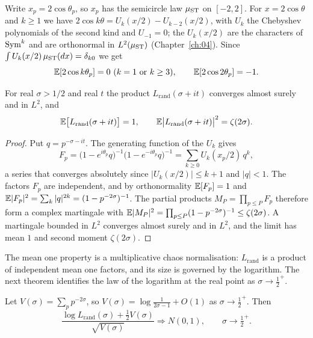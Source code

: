 Write $x_p = 2\cos\theta_p$, so $x_p$ has the semicircle law $\mu_{\mathrm{ST}}$ on $[-2,2]$. For $x = 2\cos\theta$ and $k\ge1$ we have $2\cos k\theta = U_k(x/2) - U_{k-2}(x/2)$, with $U_k$ the Chebyshev polynomials of the second kind and $U_{-1} = 0$; the $U_k(x/2)$ are the characters of $\operatorname{Sym}^k$ and are orthonormal in $L^2(\mu_{\mathrm{ST}})$ (Chapter~\ref{ch:04}). Since $\int U_k(x/2)\,\mu_{\mathrm{ST}}(dx) = \delta_{k0}$ we get
\begin{equation}\label{eq:ch09moments}
\mathbb{E}[2\cos k\theta_p] = 0 \ (k=1 \text{ or } k\ge3), \qquad \mathbb{E}[2\cos 2\theta_p] = -1 .
\end{equation}

\begin{proposition}\label{prop:ch09martingale}
For real $\sigma>1/2$ and real $t$ the product $L_{\mathrm{rand}}(\sigma+it)$ converges almost surely and in $L^2$, and
\[
\mathbb{E}\bigl[L_{\mathrm{rand}}(\sigma+it)\bigr] = 1,\qquad \mathbb{E}\bigl|L_{\mathrm{rand}}(\sigma+it)\bigr|^2 = \zeta(2\sigma).
\]
\end{proposition}

\begin{proof}
Put $q = p^{-\sigma-it}$. The generating function of the $U_k$ gives
\[
F_p = \bigl(1-e^{i\theta_p}q\bigr)^{-1}\bigl(1-e^{-i\theta_p}q\bigr)^{-1} = \sum_{k\ge0}U_k(x_p/2)\,q^k ,
\]
a series that converges absolutely since $|U_k(x/2)|\le k+1$ and $|q|<1$. The factors $F_p$ are independent, and by orthonormality $\mathbb{E}[F_p] = 1$ and $\mathbb{E}|F_p|^2 = \sum_k |q|^{2k} = (1-p^{-2\sigma})^{-1}$. The partial products $M_P = \prod_{p\le P}F_p$ therefore form a complex martingale with $\mathbb{E}|M_P|^2 = \prod_{p\le P}(1-p^{-2\sigma})^{-1}\le\zeta(2\sigma)$. A martingale bounded in $L^2$ converges almost surely and in $L^2$, and the limit has mean $1$ and second moment $\zeta(2\sigma)$.
\end{proof}

The mean one property is a multiplicative chaos normalisation: $L_{\mathrm{rand}}$ is a product of independent mean one factors, and its size is governed by the logarithm. The next theorem identifies the law of the logarithm at the real point as $\sigma\to\frac12^+$.

\begin{theorem}\label{thm:ch09clt}
Let $V(\sigma) = \sum_p p^{-2\sigma}$, so $V(\sigma) = \log\frac{1}{2\sigma-1}+O(1)$ as $\sigma\to\frac12^+$. Then
\[
\frac{\log L_{\mathrm{rand}}(\sigma) + \frac12 V(\sigma)}{\sqrt{V(\sigma)}} \Longrightarrow N(0,1), \qquad \sigma\to\tfrac12^+ .
\]
\end{theorem}

